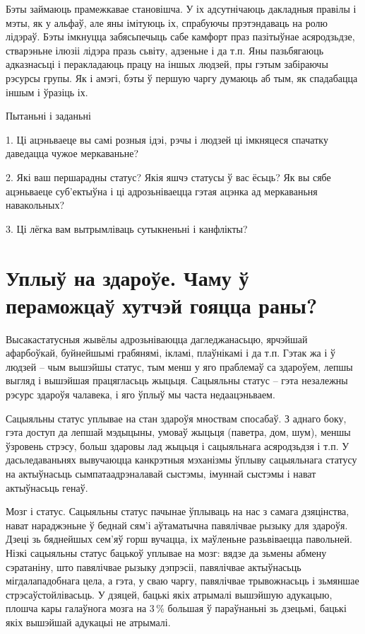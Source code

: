 Бэты займаюць прамежкавае становішча. У іх адсутнічаюць дакладныя правілы і мэты, як у альфаў, але яны імітуюць іх, спрабуючы прэтэндаваць на ролю лідэраў. Бэты імкнуцца забясьпечыць сабе камфорт праз пазітыўнае асяродзьдзе, стварэньне ілюзіі лідэра празь сьвіту, адзеньне і да т.п. Яны пазьбягаюць адказнасьці і перакладаюць працу на іншых людзей, пры гэтым забіраючы рэсурсы групы. Як і амэгі, бэты ў першую чаргу думаюць аб тым, як спадабацца іншым і ўразіць іх.

Пытаньні і заданьні

1. Ці ацэньваеце вы самі розныя ідэі, рэчы і людзей ці імкняцеся спачатку даведацца чужое меркаваньне?

2. Які ваш першарадны статус? Якія яшчэ статусы ў вас ёсьць? Як вы сябе ацэньваеце суб'ектыўна і ці адрозьніваецца гэтая ацэнка ад меркаваньня навакольных?

3. Ці лёгка вам вытрымліваць сутыкненьні і канфлікты?


\section{Уплыў на здароўе. Чаму ў пераможцаў хутчэй гояцца раны?}

Высакастатусныя жывёлы адрозьніваюцца дагледжанасьцю, ярчэйшай афарбоўкай, буйнейшымі грабянямі, ікламі, плаўнікамі і да т.п. Гэтак жа і ў людзей – чым вышэйшы статус, тым менш у яго праблемаў са здароўем, лепшы выгляд і вышэйшая працягласьць жыцьця. Сацыяльны статус – гэта незалежны рэсурс здароўя чалавека, і яго ўплыў мы часта недаацэньваем. 

Сацыяльны статус уплывае на стан здароўя мноствам спосабаў. З аднаго боку, гэта доступ да лепшай мэдыцыны, умоваў жыцьця (паветра, дом, шум), меншы ўзровень стрэсу, больш здаровы лад жыцьця і сацыяльнага асяродзьдзя і т.п. У дасьледаваньнях вывучаюцца канкрэтныя мэханізмы ўплыву сацыяльнага статусу на актыўнасьць сымпатаадрэналавай сыстэмы, імуннай сыстэмы і нават актыўнасьць генаў.

Мозг і статус. Сацыяльны статус пачынае ўплываць на нас з самага дзяцінства, нават нараджэньне ў беднай сям'і аўтаматычна павялічвае рызыку для здароўя. Дзеці зь бяднейшых сем'яў горш вучацца, іх маўленьне разьвіваецца павольней. Нізкі сацыяльны статус бацькоў уплывае на мозг: вядзе да зьмены абмену сэратаніну, што павялічвае рызыку дэпрэсіі, павялічвае актыўнасьць мігдалападобнага цела, а гэта, у сваю чаргу, павялічвае трывожнасьць і зьмяншае стрэсаўстойлівасьць. У дзяцей, бацькі якіх атрымалі вышэйшую адукацыю, плошча кары галаўнога мозга на 3\,\% большая ў параўнаньні зь дзецьмі, бацькі якіх вышэйшай адукацыі не атрымалі.

